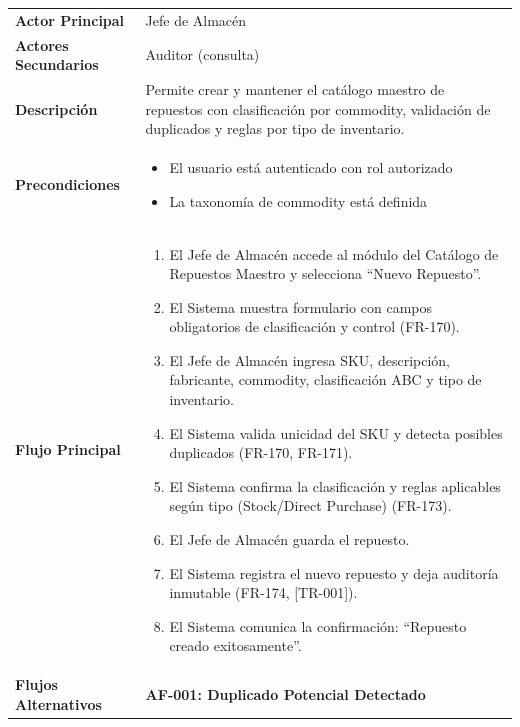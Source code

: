 \begin{longtable}{>{\raggedright\arraybackslash}p{0.21\textwidth} >{\raggedright\arraybackslash}p{0.74\textwidth}} \toprule
\textbf{Actor Principal} & Jefe de Almacén \\
\textbf{Actores Secundarios} & Auditor (consulta) \\
\textbf{Descripción} & Permite crear y mantener el catálogo maestro de repuestos con clasificación por commodity, validación de duplicados y reglas por tipo de inventario. \\
\textbf{Precondiciones} & \parbox[t]{\linewidth}{\vspace{2pt} \begin{itemize}[leftmargin=1.5em, nosep, topsep=0pt]
\item El usuario está autenticado con rol autorizado
\item La taxonomía de commodity está definida
\end{itemize} \vspace{2pt}} \\
\textbf{Flujo Principal} & \parbox[t]{\linewidth}{\vspace{2pt} \begin{enumerate}[leftmargin=1.5em, nosep, topsep=0pt]
\item El Jefe de Almacén accede al módulo del Catálogo de Repuestos Maestro y selecciona ``Nuevo Repuesto''.
\item El Sistema muestra formulario con campos obligatorios de clasificación y control (FR-170).
\item El Jefe de Almacén ingresa SKU, descripción, fabricante, commodity, clasificación ABC y tipo de inventario.
\item El Sistema valida unicidad del SKU y detecta posibles duplicados (FR-170, FR-171).
\item El Sistema confirma la clasificación y reglas aplicables según tipo (Stock/Direct Purchase) (FR-173).
\item El Jefe de Almacén guarda el repuesto.
\item El Sistema registra el nuevo repuesto y deja auditoría inmutable (FR-174, [TR-001]).
\item El Sistema comunica la confirmación: ``Repuesto creado exitosamente''.
\end{enumerate} \vspace{2pt}} \\
\textbf{Flujos Alternativos} & \parbox[t]{\linewidth}{\vspace{2pt} \vspace{4pt}\noindent\textbf{AF-001: Duplicado Potencial Detectado}
}
\end{longtable}
